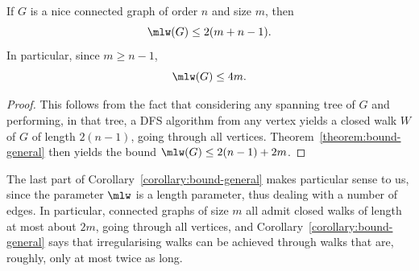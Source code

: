 \documentclass[a4paper,11pt,dvipsnames]{elsarticle}
\begin{document}

\begin{corollary}\label{corollary:bound-general}
If $G$ is a nice connected graph of order $n$ and size $m$,
then $$\mlw(G) \leq 2(m+n-1).$$
In particular, since $m \geq n-1$, $$\mlw(G) \leq 4m.$$
\end{corollary}

\begin{proof}
This follows from the fact that considering any spanning tree of $G$ and performing, in that tree, a DFS algorithm from any vertex yields a closed walk $W$ of $G$ of length $2(n-1)$, going through all vertices.
Theorem~\ref{theorem:bound-general} then yields the bound $\mlw(G)\leq 2(n-1)+2m$.
\end{proof}

The last part of Corollary~\ref{corollary:bound-general} makes particular sense to us, since the parameter $\mlw$ is a length parameter, thus dealing with a number of edges. In particular, connected graphs of size $m$ all admit closed walks of length at most about $2m$, going through all vertices,
and Corollary~\ref{corollary:bound-general} says that irregularising walks can be achieved through walks that are, roughly, only at most twice as long.

\medskip
\end{document}
